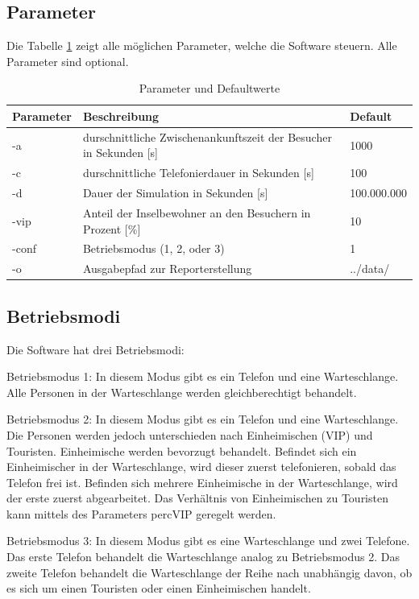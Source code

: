 \subsection{Parameter}
Die Tabelle \ref{tab:parameter} zeigt alle möglichen Parameter, welche die Software steuern. Alle Parameter sind optional. 
\begin{table}[htpb]
	\centering
	\begin{tabular}{lll}
		Parameter & Beschreibung  &  Default\\ \hline
		-a & durschnittliche Zwischenankunftszeit der Besucher in Sekunden [s] & 1000 \\
		-c & durschnittliche Telefonierdauer in Sekunden [s] & 100 \\
		-d & Dauer der Simulation in Sekunden [s] & 100.000.000 \\
		-vip & Anteil der Inselbewohner an den Besuchern in Prozent [\%] &  10 \\
		-conf & Betriebsmodus (1, 2, oder 3) & 1 \\
		-o & Ausgabepfad zur Reporterstellung & ../data/
	\end{tabular}
	\caption{Parameter und Defaultwerte}
	\label{tab:parameter}
\end{table}


\subsection{Betriebsmodi}
Die Software hat drei Betriebsmodi:
\begin{list}{}
	\item Betriebsmodus 1: In diesem Modus gibt es ein Telefon und eine Warteschlange. Alle Personen in der Warteschlange werden gleichberechtigt behandelt.
	\item Betriebsmodus 2: In diesem Modus gibt es ein Telefon und eine Warteschlange. Die Personen werden jedoch unterschieden nach Einheimischen (VIP) und Touristen. Einheimische werden bevorzugt behandelt. Befindet sich ein Einheimischer in der Warteschlange, wird dieser zuerst telefonieren, sobald das Telefon frei ist. Befinden sich mehrere Einheimische in der Warteschlange, wird der erste zuerst abgearbeitet. Das Verhältnis von Einheimischen zu Touristen kann mittels des Parameters percVIP geregelt werden.
	\item Betriebsmodus 3: In diesem Modus gibt es eine Warteschlange und zwei Telefone. Das erste Telefon behandelt die Warteschlange analog zu Betriebsmodus 2. Das zweite Telefon behandelt die Warteschlange der Reihe nach unabhängig davon, ob es sich um einen Touristen oder einen Einheimischen handelt.
\end{list}

